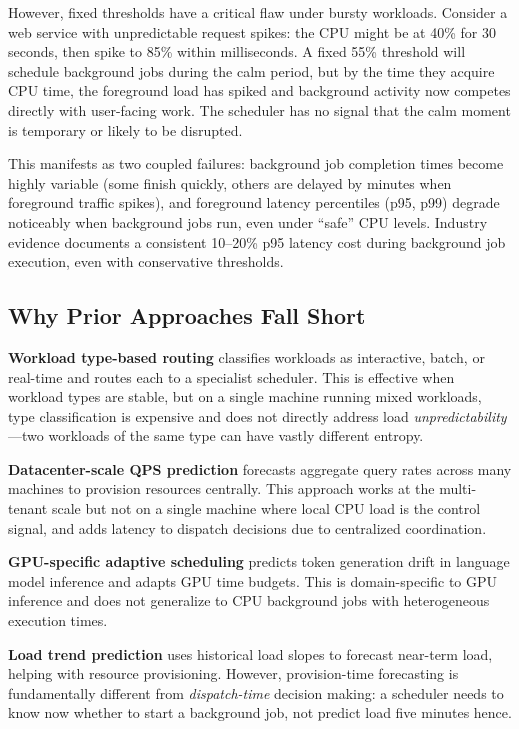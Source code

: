 \documentclass[11pt,letterpaper]{article}
\begin{document}
However, fixed thresholds have a critical flaw under bursty workloads. Consider a web service with unpredictable request spikes: the CPU might be at 40\% for 30 seconds, then spike to 85\% within milliseconds. A fixed 55\% threshold will schedule background jobs during the calm period, but by the time they acquire CPU time, the foreground load has spiked and background activity now competes directly with user-facing work. The scheduler has no signal that the calm moment is temporary or likely to be disrupted.

This manifests as two coupled failures: background job completion times become highly variable (some finish quickly, others are delayed by minutes when foreground traffic spikes), and foreground latency percentiles (p95, p99) degrade noticeably when background jobs run, even under ``safe'' CPU levels. Industry evidence documents a consistent 10--20\% p95 latency cost during background job execution, even with conservative thresholds.

\subsection{Why Prior Approaches Fall Short}

\textbf{Workload type-based routing} classifies workloads as interactive, batch, or real-time and routes each to a specialist scheduler. This is effective when workload types are stable, but on a single machine running mixed workloads, type classification is expensive and does not directly address load \textit{unpredictability}---two workloads of the same type can have vastly different entropy.

\textbf{Datacenter-scale QPS prediction} forecasts aggregate query rates across many machines to provision resources centrally. This approach works at the multi-tenant scale but not on a single machine where local CPU load is the control signal, and adds latency to dispatch decisions due to centralized coordination.

\textbf{GPU-specific adaptive scheduling} predicts token generation drift in language model inference and adapts GPU time budgets. This is domain-specific to GPU inference and does not generalize to CPU background jobs with heterogeneous execution times.

\textbf{Load trend prediction} uses historical load slopes to forecast near-term load, helping with resource provisioning. However, provision-time forecasting is fundamentally different from \textit{dispatch-time} decision making: a scheduler needs to know now whether to start a background job, not predict load five minutes hence.
\end{document}
